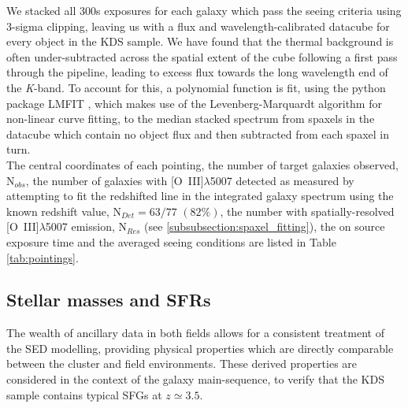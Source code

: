 \documentclass[fleqn,usenatbib]{mnras}
\begin{document}
We stacked all 300s exposures for each galaxy which pass the seeing criteria using 3-sigma clipping, leaving us with a flux and wavelength-calibrated datacube for every object in the KDS sample.
We have found that the thermal background is often under-subtracted across the spatial extent of the cube following a first pass through the pipeline, leading to excess flux towards the long wavelength end of the {\it K}-band.
To account for this, a polynomial function is fit, using the python package {\scriptsize LMFIT} \citep{Newville2014}, which makes use of the Levenberg-Marquardt algorithm for non-linear curve fitting, to the median stacked spectrum from spaxels in the datacube which contain no object flux and then subtracted from each spaxel in turn. \\


The central coordinates of each pointing, the number of target galaxies observed, N$_{obs}$, the number of galaxies with [O~{\sc III}]$\lambda$5007 detected as measured by attempting to fit the redshifted line in the integrated galaxy spectrum using the known redshift value, N$_{Det} = 63/77$ $(82\%)$, the number with spatially-resolved [O~{\sc III}]$\lambda$5007 emission, N$_{Res}$ (see \cref{subsubsection:spaxel_fitting}), the on source exposure time and the averaged seeing conditions are listed in Table \ref{tab:pointings}.

\subsection{Stellar masses and SFRs}\label{subsec:stellar_masses_and_sfrs}

The wealth of ancillary data in both fields allows for a consistent treatment of the SED modelling, providing physical properties which are directly comparable between the cluster and field environments.
These derived properties are considered in the context of the galaxy main-sequence, to verify that the KDS sample contains typical SFGs at $z\simeq3.5$.
\end{document}
